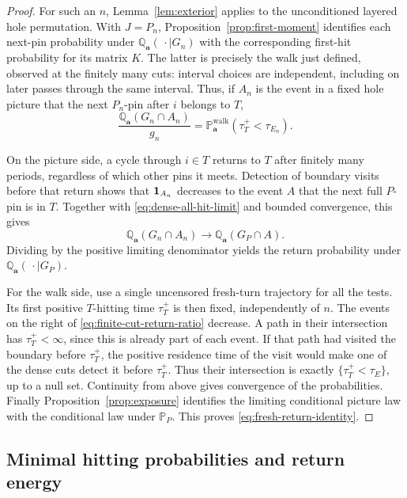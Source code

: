 \begin{proof}
For such an \(n\), Lemma~\ref{lem:exterior} applies to the
unconditioned layered hole permutation.  With \(J=P_n\),
Proposition~\ref{prop:first-moment} identifies each next-pin probability
under \(\mathbb Q_{\mathbf a}(\,\cdot\mid G_n)\) with the
corresponding first-hit probability for its matrix \(K\).  The latter
is precisely the walk just defined, observed at the finitely many cuts:
interval choices are independent, including on later passes through
the same interval.  Thus, if \(A_n\) is the event in a fixed hole
picture that the next \(P_n\)-pin after \(i\) belongs to \(T\),
\begin{equation}
 \frac{\mathbb Q_{\mathbf a}(G_n\cap A_n)}{g_n}
      =\mathbb P_{\mathbf a}^{\mathrm{walk}}
                         (\tau_T^+<\tau_{E_n}).
 \label{eq:finite-cut-return-ratio}
\end{equation}

On the picture side, a cycle through \(i\in T\) returns to \(T\)
after finitely many periods, regardless of which other pins it meets.
Detection of boundary visits before that return shows that
\(\mathbf 1_{A_n}\) decreases to the event \(A\) that the next full
\(P\)-pin is in \(T\).  Together with
\eqref{eq:dense-all-hit-limit} and bounded convergence, this gives
\[
 \mathbb Q_{\mathbf a}(G_n\cap A_n)
       \longrightarrow\mathbb Q_{\mathbf a}(G_P\cap A).
\]
Dividing by the positive limiting denominator yields the return
probability under \(\mathbb Q_{\mathbf a}(\,\cdot\mid G_P)\).

For the walk side, use a single uncensored fresh-turn trajectory for
all the tests.  Its first positive \(T\)-hitting time \(\tau_T^+\)
is then fixed, independently of \(n\).  The events on the right of
\eqref{eq:finite-cut-return-ratio} decrease.  A path in their
intersection has \(\tau_T^+<\infty\), since this is already part
of each event.  If that path had visited the boundary before
\(\tau_T^+\), the positive residence time of the visit would make
one of the dense cuts detect it before \(\tau_T^+\).  Thus their
intersection is exactly \(\{\tau_T^+<\tau_E\}\), up to a null
set.  Continuity from above gives convergence of the probabilities.
Finally Proposition~\ref{prop:exposure} identifies the limiting
conditional picture law with the conditional law under
\(\mathbb P_P\).  This proves \eqref{eq:fresh-return-identity}.
\end{proof}

\subsection{Minimal hitting probabilities and return energy}

